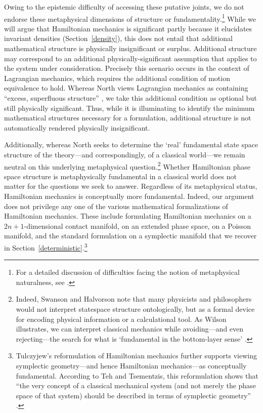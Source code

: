 \documentclass[12pt, english, twoside]{article} %
\begin{document}
Owing to the epistemic difficulty of accessing these putative joints, we do not endorse these metaphysical dimensions of structure or fundamentality.\footnote{For a detailed discussion of difficulties facing the notion of metaphysical naturalness, see \textcites[]{Dorr_Hawthorne}.} While we will argue that Hamiltonian mechanics is significant partly because it elucidates invariant densities (Section~\ref{density}), this does not entail that additional mathematical structure is physically insignificant or surplus. Additional structure may correspond to an additional physically-significant assumption that applies to the system under consideration. Precisely this scenario occurs in the context of Lagrangian mechanics, which requires the additional condition of motion equivalence to hold. Whereas North views Lagrangian mechanics as containing ``excess, superfluous structure'' \parencites*[75]{North}, we take this additional condition as optional but still physically significant. Thus, while it is illuminating to identify the minimum mathematical structures necessary for a formulation, additional structure is not automatically rendered physically insignificant. 

Additionally, whereas North \parencites*[76]{North} seeks to determine the `real' fundamental state space structure of the theory---and correspondingly, of a classical world---we remain neutral on this underlying metaphysical question.\footnote{Indeed, Swanson and Halvorson \parencites*[]{Swanson} note that many physicists and philosophers would not interpret statespace structure ontologically, but as a formal device for encoding physical information or a calculational tool. As Wilson illustrates, we can interpret classical mechanics while avoiding---and even rejecting---the search for what is `fundamental in the bottom-layer sense' \parencites*[53]{Wilson}.} Whether Hamiltonian phase space structure is metaphysically fundamental in a classical world does not matter for the questions we seek to answer. Regardless of its metaphysical status, Hamiltonian mechanics is conceptually more fundamental. Indeed, our argument does not privilege any one of the various mathematical formalizations of Hamiltonian mechanics. These include formulating Hamiltonian mechanics on a $2n+1$-dimensional contact manifold, on an extended phase space, on a Poisson manifold, and the standard formulation on a symplectic manifold that we recover in Section~\ref{deterministic}.\footnote{Tulczyjew's reformulation of Hamiltonian mechanics further supports viewing symplectic geometry---and hence Hamiltonian mechanics---as conceptually fundamental. According to Teh and Tsementzis, this reformulation shows that  ``the very concept of a classical mechanical system (and not merely the phase space of that system) should be described in terms of symplectic geometry'' \parencites*[46]{Teh}.}
\end{document}

